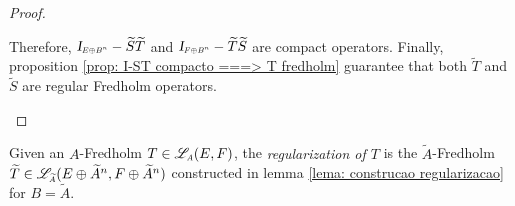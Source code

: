 \begin{lema}
\begin{proof}
\begin{itroman}
\begin{alter}
        \end{alter}
        Therefore, $\sub \Id{E\oplus B^n} - \widetilde S\widetilde T$ and $\sub \Id{F\oplus B^n} - \widetilde T\widetilde S$ are compact operators. Finally, proposition \ref{prop: I-ST compacto ===>  T fredholm} guarantee that both $\widetilde T$ and $\widetilde S$ are regular Fredholm operators. \qedhere
    \end{itroman}
    \end{proof}
\end{lema}

\begin{definicao}
\label{def: regularizacao de Fredholm}
Given an $A$-Fredholm $T\in \sub\adj{A}(E,F)$, the \textit{regularization of $T$} is the $\widetilde{A}$-Fredholm $\widetilde T \in \sub{\adj}{\widetilde{A}}(E\oplus \widetilde{A}^n,F\oplus \widetilde{A}^n)$ constructed in lemma \ref{lema: construcao regularizacao} for $B = \widetilde{A}$. 
\end{definicao}

